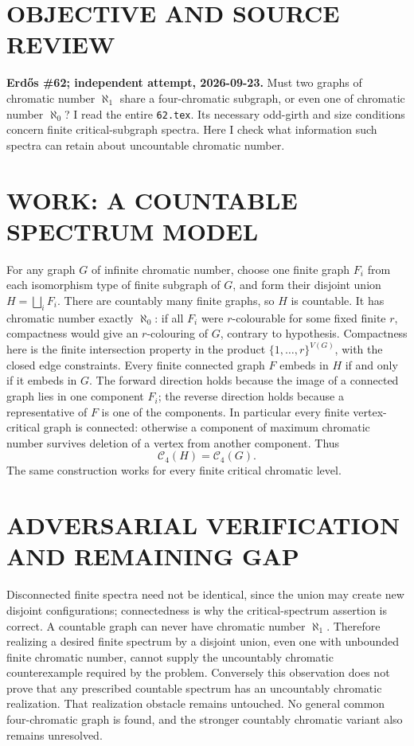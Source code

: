 \section{OBJECTIVE AND SOURCE REVIEW}
\textbf{Erd\H{o}s \#62; independent attempt, 2026-09-23.}
Must two graphs of chromatic number $\aleph_1$ share a four-chromatic subgraph, or even one of chromatic number $\aleph_0$? I read the entire \texttt{62.tex}. Its necessary odd-girth and size conditions concern finite critical-subgraph spectra. Here I check what information such spectra can retain about uncountable chromatic number.
\section{WORK: A COUNTABLE SPECTRUM MODEL}
For any graph $G$ of infinite chromatic number, choose one finite graph $F_i$ from each isomorphism type of finite subgraph of $G$, and form their disjoint union $H=\bigsqcup_i F_i$. There are countably many finite graphs, so $H$ is countable. It has chromatic number exactly $\aleph_0$: if all $F_i$ were $r$-colourable for some fixed finite $r$, compactness would give an $r$-colouring of $G$, contrary to hypothesis. Compactness here is the finite intersection property in the product $\{1,\ldots,r\}^{V(G)}$, with the closed edge constraints.
Every finite connected graph $F$ embeds in $H$ if and only if it embeds in $G$. The forward direction holds because the image of a connected graph lies in one component $F_i$; the reverse direction holds because a representative of $F$ is one of the components. In particular every finite vertex-critical graph is connected: otherwise a component of maximum chromatic number survives deletion of a vertex from another component. Thus
\[
\mathcal C_4(H)=\mathcal C_4(G).
\]
The same construction works for every finite critical chromatic level.
\section{ADVERSARIAL VERIFICATION AND REMAINING GAP}
Disconnected finite spectra need not be identical, since the union may create new disjoint configurations; connectedness is why the critical-spectrum assertion is correct. A countable graph can never have chromatic number $\aleph_1$. Therefore realizing a desired finite spectrum by a disjoint union, even one with unbounded finite chromatic number, cannot supply the uncountably chromatic counterexample required by the problem. Conversely this observation does not prove that any prescribed countable spectrum has an uncountably chromatic realization. That realization obstacle remains untouched. No general common four-chromatic graph is found, and the stronger countably chromatic variant also remains unresolved.
